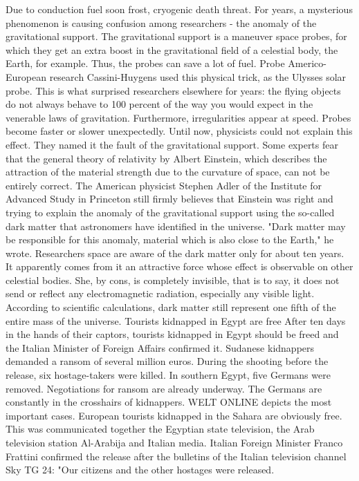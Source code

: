 Due to conduction fuel soon frost, cryogenic death threat.
For years, a mysterious phenomenon is causing confusion among researchers - the anomaly of the gravitational support.
The gravitational support is a maneuver space probes, for which they get an extra boost in the gravitational field of a celestial body, the Earth, for example.
Thus, the probes can save a lot of fuel.
Probe Americo-European research Cassini-Huygens used this physical trick, as the Ulysses solar probe.
This is what surprised researchers elsewhere for years: the flying objects do not always behave to 100 percent of the way you would expect in the venerable laws of gravitation.
Furthermore, irregularities appear at speed.
Probes become faster or slower unexpectedly.
Until now, physicists could not explain this effect.
They named it the fault of the gravitational support.
Some experts fear that the general theory of relativity by Albert Einstein, which describes the attraction of the material strength due to the curvature of space, can not be entirely correct.
The American physicist Stephen Adler of the Institute for Advanced Study in Princeton still firmly believes that Einstein was right and trying to explain the anomaly of the gravitational support using the so-called dark matter that astronomers have identified in the universe.
"Dark matter may be responsible for this anomaly, material which is also close to the Earth," he wrote.
Researchers space are aware of the dark matter only for about ten years.
It apparently comes from it an attractive force whose effect is observable on other celestial bodies.
She, by cons, is completely invisible, that is to say, it does not send or reflect any electromagnetic radiation, especially any visible light.
According to scientific calculations, dark matter still represent one fifth of the entire mass of the universe.
Tourists kidnapped in Egypt are free
After ten days in the hands of their captors, tourists kidnapped in Egypt should be freed and the Italian Minister of Foreign Affairs confirmed it.
Sudanese kidnappers demanded a ransom of several million euros.
During the shooting before the release, six hostage-takers were killed.
In southern Egypt, five Germans were removed.
Negotiations for ransom are already underway.
The Germans are constantly in the crosshairs of kidnappers.
WELT ONLINE depicts the most important cases.
European tourists kidnapped in the Sahara are obviously free.
This was communicated together the Egyptian state television, the Arab television station Al-Arabija and Italian media.
Italian Foreign Minister Franco Frattini confirmed the release after the bulletins of the Italian television channel Sky TG 24: "Our citizens and the other hostages were released.
